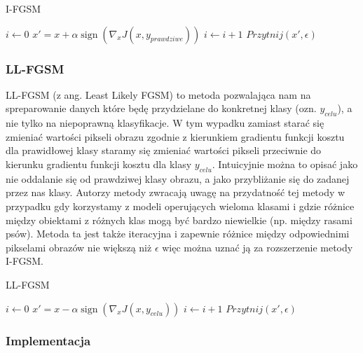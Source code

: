 \documentclass{article}
\begin{document}
    \begin{algorithm}
    \caption{I-FGSM}\label{IFGSM}
    \begin{algorithmic}[1]
    \State $i \gets 0$
        \State $x' = x + \alpha\operatorname{sign}(\nabla_{x} J(x, y_{prawdziwe}))$
        \State $i \gets i+1$
        \State $Przytnij(x', \epsilon)$
    \EndWhile
    \end{algorithmic}
    \end{algorithm}

    \subsubsection{LL-FGSM}
    LL-FGSM (z ang. Least Likely FGSM) to metoda pozwalająca nam na spreparowanie danych które będę przydzielane do
    konkretnej klasy (ozn. $y_{celu}$), a nie tylko na niepoprawną klasyfikacje. W tym wypadku zamiast starać się
    zmieniać wartości pikseli obrazu zgodnie z kierunkiem gradientu funkcji kosztu dla prawidłowej klasy
    staramy się zmieniać wartości pikseli przeciwnie do kierunku gradientu funkcji kosztu dla klasy $y_{celu}$.
    Intuicyjnie można to opisać jako nie oddalanie się od prawdziwej klasy obrazu, a jako przybliżanie się do zadanej
    przez nas klasy.
    Autorzy metody zwracają uwagę na przydatność tej metody
    w przypadku gdy korzystamy z modeli operujących wieloma klasami i gdzie różnice między obiektami z różnych klas mogą
    być bardzo niewielkie (np. między rasami psów). Metoda ta jest także iteracyjna i zapewnie różnice między
    odpowiednimi pikselami obrazów nie większą niż $\epsilon$ więc można uznać ją za rozszerzenie metody I-FGSM.

    \begin{algorithm}
    \caption{LL-FGSM}\label{LLFGSM}
    \begin{algorithmic}[1]
    \State $i \gets 0$
        \State $x' = x - \alpha\operatorname{sign}(\nabla_{x} J(x, y_{celu}))$
        \State $i \gets i+1$
        \State $Przytnij(x', \epsilon)$
    \EndWhile
    \end{algorithmic}
    \end{algorithm}

\subsubsection{Implementacja}
\end{document}
